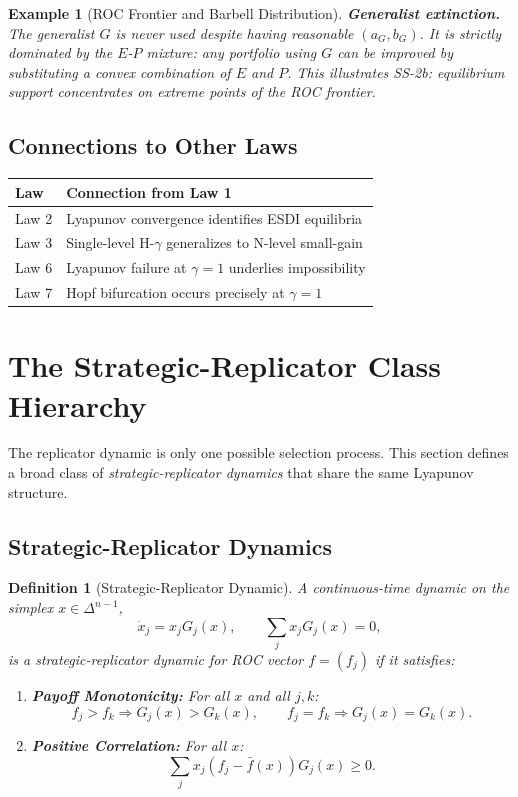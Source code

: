 \documentclass[12pt]{article}
\newtheorem{definition}[theorem]{Definition}
\newtheorem{example}[theorem]{Example}
\begin{document}
\begin{example}[ROC Frontier and Barbell Distribution]
\textbf{Generalist extinction.} The generalist $G$ is never used despite having reasonable $(a_G, b_G)$. It is strictly dominated by the $E$-$P$ mixture: any portfolio using $G$ can be improved by substituting a convex combination of $E$ and $P$. This illustrates SS-2b: equilibrium support concentrates on extreme points of the ROC frontier.
\end{example}

\subsection{Connections to Other Laws}

\begin{center}
\begin{tabular}{ll}
\toprule
\textbf{Law} & \textbf{Connection from Law 1} \\
\midrule
Law 2 & Lyapunov convergence identifies ESDI equilibria \\
Law 3 & Single-level H-$\gamma$ generalizes to N-level small-gain \\
Law 6 & Lyapunov failure at $\gamma = 1$ underlies impossibility \\
Law 7 & Hopf bifurcation occurs precisely at $\gamma = 1$ \\
\bottomrule
\end{tabular}
\end{center}

\section{The Strategic-Replicator Class Hierarchy}
\label{sec:sr-class}

The replicator dynamic is only one possible selection process. This section defines a broad class of \emph{strategic-replicator dynamics} that share the same Lyapunov structure.

\subsection{Strategic-Replicator Dynamics}

\begin{definition}[Strategic-Replicator Dynamic]
\label{def:sr-dynamic}
A continuous-time dynamic on the simplex $x \in \Delta^{n-1}$,
\[
\dot{x}_j = x_j G_j(x), \qquad \sum_j x_j G_j(x) = 0,
\]
is a \emph{strategic-replicator dynamic} for ROC vector $f = (f_j)$ if it satisfies:
\begin{enumerate}
    \item \textbf{Payoff Monotonicity:} For all $x$ and all $j, k$:
    \[
    f_j > f_k \Rightarrow G_j(x) > G_k(x), \qquad f_j = f_k \Rightarrow G_j(x) = G_k(x).
    \]
    
    \item \textbf{Positive Correlation:} For all $x$:
    \[
    \sum_j x_j (f_j - \bar{f}(x)) G_j(x) \geq 0.
    \]
\end{enumerate}
\end{definition}
\end{document}
